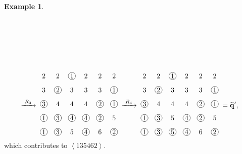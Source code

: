 \documentclass[reqno]{amsart}
\newcommand{\0}{\phantom{c}}
\newcommand{\swt}[1]{\left\langle #1 \right\rangle} %
\newcommand{\qq}{\mathbf{q}}
\theoremstyle{plain}
\theoremstyle{definition}
\newtheorem{example}[thm]{Example}
\numberwithin{equation}{section}
\begin{document}
\begin{example}
\begin{align*}
\begin{tikzpicture}[xscale=0.7,yscale=0.7,every node/.style={inner sep=0.8pt},baseline=55]
\end{tikzpicture}
\allowdisplaybreaks
\\[1.3em] &
\; \xrightarrow[\hspace{15pt}]{R_3} \;
\begin{tikzpicture}[xscale=0.7,yscale=0.7,every node/.style={inner sep=0.8pt},baseline=55]
\node at (0, 5){2};\node at (1, 5){2};\node[circle, draw=black] at (2, 5){1};\node at (3, 5){2};\node at (4, 5){2};\node at (5, 5){2};\node at (0, 4){3};\node[circle, draw=black] at (1, 4){2};\node at (2, 4){3};\node at (3, 4){3};\node at (4, 4){3};\node[circle, draw=black] at (5, 4){1};\node[circle, draw=black] at (0, 3){3};\node at (1, 3){4};\node at (2, 3){4};\node at (3, 3){4};\node[circle, draw=black] at (4, 3){2};\node[circle, draw=black] at (5, 3){1};\node[circle, draw=black] at (0, 2){1};\node[circle, draw=black] at (1, 2){3};\node[circle, draw=black] at (2, 2){4};\node[circle, draw=black] at (3, 2){4};\node[circle, draw=black] at (4, 2){2};\node at (5, 2){5};\node[circle, draw=black] at (0, 1){1};\node[circle, draw=black] at (1, 1){3};\node at (2, 1){5};\node[circle, draw=black] at (3, 1){4};\node at (4, 1){6};\node[circle, draw=black] at (5, 1){2};\end{tikzpicture}
\; \xrightarrow[\hspace{15pt}]{R_4} \;
\begin{tikzpicture}[xscale=0.7,yscale=0.7,every node/.style={inner sep=0.8pt},baseline=55]
\node at (0, 5){2};\node at (1, 5){2};\node[circle, draw=black] at (2, 5){1};\node at (3, 5){2};\node at (4, 5){2};\node at (5, 5){2};\node at (0, 4){3};\node[circle, draw=black] at (1, 4){2};\node at (2, 4){3};\node at (3, 4){3};\node at (4, 4){3};\node[circle, draw=black] at (5, 4){1};\node[circle, draw=black] at (0, 3){3};\node at (1, 3){4};\node at (2, 3){4};\node at (3, 3){4};\node[circle, draw=black] at (4, 3){2};\node[circle, draw=black] at (5, 3){1};\node[circle, draw=black] at (0, 2){1};\node[circle, draw=black] at (1, 2){3};\node at (2, 2){5};\node[circle, draw=black] at (3, 2){4};\node[circle, draw=black] at (4, 2){2};\node at (5, 2){5};\node[circle, draw=black] at (0, 1){1};\node[circle, draw=black] at (1, 1){3};\node[circle, draw=black] at (2, 1){5};\node[circle, draw=black] at (3, 1){4};\node at (4, 1){6};\node[circle, draw=black] at (5, 1){2};
\end{tikzpicture}
\; = \widetilde{\qq}',
\end{align*}
which contributes to $\swt{135462}$.
\end{example}
\end{document}
